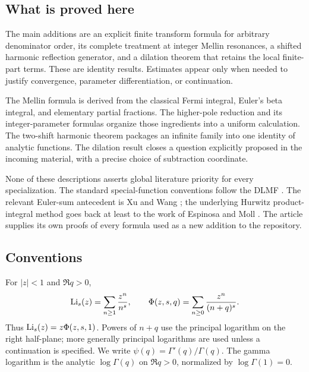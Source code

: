 \subsection{What is proved here}

The main additions are an explicit finite transform formula for arbitrary denominator order, its complete treatment at integer Mellin resonances, a shifted harmonic reflection generator, and a dilation theorem that retains the local finite-part terms. These are identity results. Estimates appear only when needed to justify convergence, parameter differentiation, or continuation.

The Mellin formula is derived from the classical Fermi integral, Euler's beta integral, and elementary partial fractions. The higher-pole reduction and its integer-parameter formulas organize those ingredients into a uniform calculation. The two-shift harmonic theorem packages an infinite family into one identity of analytic functions. The dilation result closes a question explicitly proposed in the incoming material, with a precise choice of subtraction coordinate.

None of these descriptions asserts global literature priority for every specialization. The standard special-function conventions follow the DLMF \cite{DLMFpoly,DLMFlerch,DLMFhurwitz,DLMFgamma}. The relevant Euler-sum antecedent is Xu and Wang \cite{XuWang}; the underlying Hurwitz product-integral method goes back at least to the work of Espinosa and Moll \cite{EspinosaMoll}. The article supplies its own proofs of every formula used as a new addition to the repository.

\subsection{Conventions}

For $|z|<1$ and $\Re q>0$,
\[
 \operatorname{Li}_s(z)=\sum_{n\ge1}\frac{z^n}{n^s},\qquad
 \Phi(z,s,q)=\sum_{n\ge0}\frac{z^n}{(n+q)^s}.
\]
Thus $\operatorname{Li}_s(z)=z\Phi(z,s,1)$. Powers of $n+q$ use the principal logarithm on the right half-plane; more generally principal logarithms are used unless a continuation is specified. We write $\psi(q)=\Gamma'(q)/\Gamma(q)$. The gamma logarithm is the analytic $\log\Gamma(q)$ on $\Re q>0$, normalized by $\log\Gamma(1)=0$.

